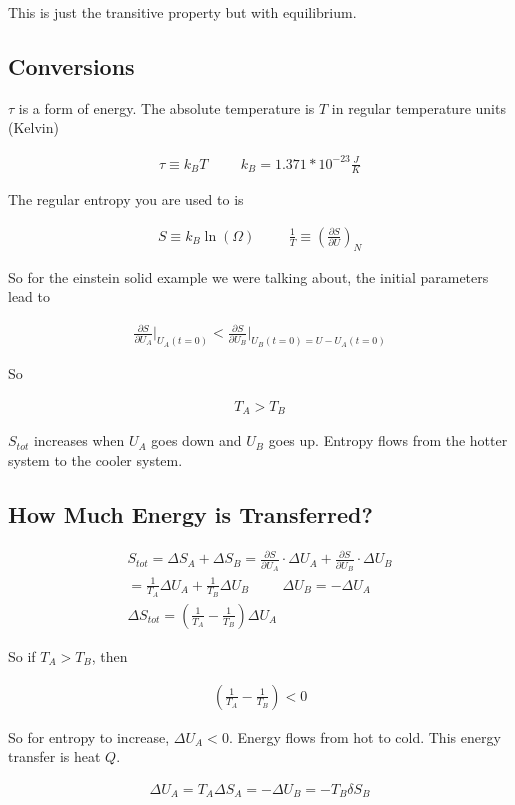 \documentclass[fleqn]{report}
\newcommand{\hp}{\hspace{1cm}}
\newcommand{\del}{\partial}
\newcommand{\equations} [1] {
\begin{gather*}
#1
\end{gather*}
}
\begin{document}
This is just the transitive property but with equilibrium.

\subsection{Conversions}

$\tau$ is a form of energy. 
The absolute temperature is $T$ in regular temperature units (Kelvin)

\equations{
    \tau 
    \equiv 
    k_B T 
    \hp 
    k_B
    =
    1.371 * 10^{-23}
    \frac{J}{K}
}

The regular entropy you are used to is 
\equations{
    S 
    \equiv 
    k_B \ln(\Omega)
    \hp 
    \frac{1}{T}
    \equiv
    \left(
        \frac{\del S}{\del U}
    \right)_N
}

So for the einstein solid example we were talking about, the initial 
parameters lead to 

\equations{
    \frac{\del S}{\del U_A}
    \Big|_{U_A(t=0)}
    <
    \frac{\del S}{\del U_B}
    \Big|_{U_B(t=0) = U - U_A(t=0)}
}

So 
\equations{
    T_A > T_B
}

$S_{tot}$ increases when $U_A$ goes down and $U_B$ goes up.
Entropy flows from the hotter system to the cooler system.

\subsection{How Much Energy is Transferred?}
\equations{
    S_{tot}
    =
    \Delta S_A
    +
    \Delta S_B 
    =
    \frac{\del S}{\del U_A}
    \cdot 
    \Delta U_A
    +
    \frac{\del S}{\del U_B}
    \cdot 
    \Delta U_B
    \\
    =
    \frac{1}{T_A}
    \Delta U_A
    +
    \frac{1}{T_B}
    \Delta U_B
    \hp 
    \Delta U_B
    =
    -\Delta U_A
    \\
    \Delta S_{tot}
    =
    \left(
        \frac{1}{T_A}
        -
        \frac{1}{T_B}
    \right)
    \Delta U_A 
}

So if $T_A > T_B$, then 

\equations{
    \left(
        \frac{1}{T_A}
        -
        \frac{1}{T_B}
    \right)
    <
    0
}

So for entropy to increase, $\Delta U_A < 0$. 
Energy flows from hot to cold. This energy transfer is heat $Q$.

\equations{
    \Delta U_A
    =
    T_A \Delta S_A 
    =
    - \Delta U_B 
    =
    - T_B \delta S_B
}
\end{document}
